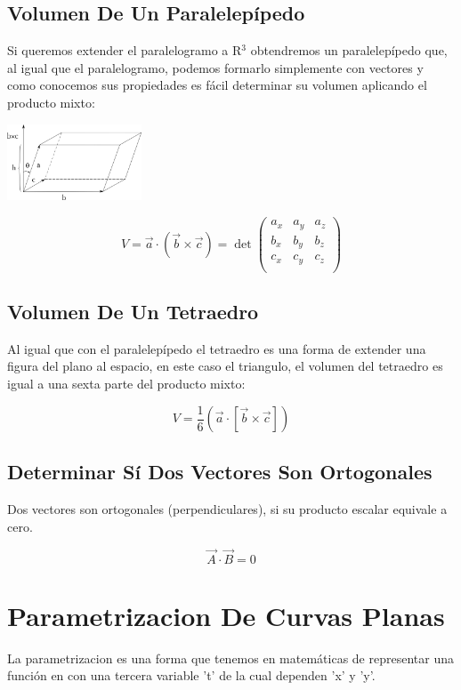 \documentclass{article}
\begin{document}
\subsection{Volumen De Un Paralelepípedo}
\label{sec:orgea0f237}
Si queremos extender el paralelogramo a R\(^{\text{3}}\) obtendremos un paralelepípedo que, al igual que el paralelogramo, podemos formarlo simplemente con vectores y como conocemos sus propiedades es fácil determinar su volumen aplicando el producto mixto:

\begin{center}
\includegraphics[width=4cm]{img/paralelipedo.png}
\end{center}

\[
V = \vec{a}\cdot(\vec{b}\times\vec{c}) = \det\begin{pmatrix}
  a_x & a_y & a_z \\
  b_x & b_y & b_z \\
  c_x & c_y & c_z \\
\end{pmatrix}
\]

\subsection{Volumen De Un Tetraedro}
\label{sec:orga642792}
Al igual que con el paralelepípedo el tetraedro es una forma de extender una figura del plano al espacio, en este caso el triangulo, el volumen del tetraedro es igual a una sexta parte del producto mixto:

\[
V = \frac{1}{6} \left( \vec{a}\cdot\left[\vec{b}\times\vec{c}\right] \right)
\]

\subsection{Determinar Sí Dos Vectores Son Ortogonales}
\label{sec:orgf647c61}
Dos vectores son ortogonales (perpendiculares), si su producto escalar equivale a cero.

\[
\vec{A} \cdot \vec{B} = 0
\]

\section{Parametrizacion De Curvas Planas}
\label{sec:org42c9cda}
La parametrizacion es una forma que tenemos en matemáticas de representar una función en con una tercera variable 't' de la cual dependen 'x' y 'y'.
\end{document}
